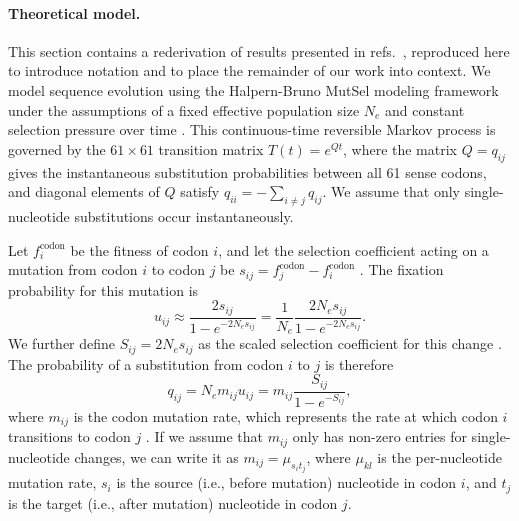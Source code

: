\documentclass{pnastwo}
\begin{document}
\begin{article}
		
\paragraph{Theoretical model.}
This section contains a rederivation of results presented in refs.\ \cite{HalpernBruno1998,YangNielsen2008}, reproduced here to introduce notation and to place the remainder of our work into context. We model sequence evolution using the Halpern-Bruno MutSel modeling framework under the assumptions of a fixed effective population size $N_e$ and constant selection pressure over time \cite{HalpernBruno1998,YangNielsen2008,Tamurietal2012,Thorne2012}.  This continuous-time reversible Markov process is governed by the $61 \times 61$ transition matrix $T(t) = e^{Qt}$, where the matrix $Q = q_{ij}$ gives the instantaneous substitution probabilities between all 61 sense codons, and diagonal elements of $Q$ satisfy $q_{ii} = -\sum_{i \neq j} q_{ij}$. We assume that only single-nucleotide substitutions occur instantaneously. 

Let $f^\text{codon}_i$ be the fitness of codon $i$, and let the selection coefficient acting on a mutation from codon $i$ to codon $j$ be $s_{ij} = f^\text{codon}_j - f^\text{codon}_i$ \cite{SellaHirsh2005,YangNielsen2008}. The fixation probability for this mutation is \cite{Kimura1962,HalpernBruno1998,YangNielsen2008}
\begin{equation}\label{eq:u_ij}
u_{ij} \approx \frac{2s_{ij}}{1 - e^{-2N_es_{ij}}} = \frac{1}{N_e}\frac{2N_es_{ij}}{1 - e^{-2N_es_{ij}}} .
\end{equation}
We further define $S_{ij} = 2N_es_{ij}$ as the scaled selection coefficient for this change \cite{YangNielsen2008}. The probability of a substitution from codon $i$ to $j$ is therefore
\begin{equation}\label{eq:q_ij}
q_{ij} = N_em_{ij}u_{ij} = m_{ij}\frac{S_{ij}}{1 - e^{-S_{ij}}} , 
\end{equation} where $m_{ij}$ is the codon mutation rate, which represents the rate at which codon $i$ transitions to codon $j$  \cite{HalpernBruno1998,SellaHirsh2005}. If we assume that $m_{ij}$ only has non-zero entries for  single-nucleotide changes, we can write it as $m_{ij}=\mu_{s_it_j}$, where $\mu_{kl}$ is the per-nucleotide mutation rate, $s_i$ is the source (i.e., before mutation) nucleotide in codon $i$, and $t_j$ is the target (i.e., after mutation) nucleotide in codon $j$.


\end{article}
\end{document}
